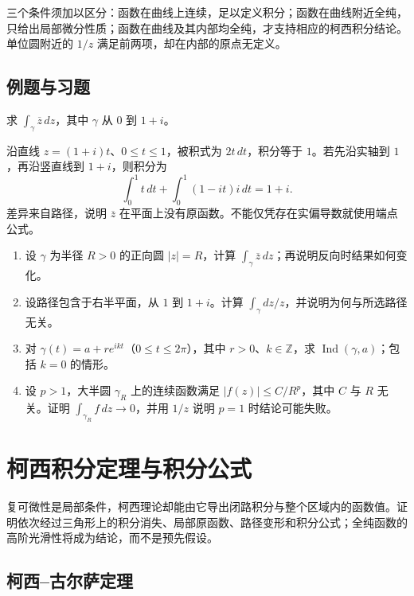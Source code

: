 \documentclass[UTF8,12pt,a4paper,fontset=fandol]{ctexbook}
\begin{document}
三个条件须加以区分：函数在曲线上连续，足以定义积分；函数在曲线附近全纯，只给出局部微分性质；函数在曲线及其内部均全纯，才支持相应的柯西积分结论。单位圆附近的 $1/z$ 满足前两项，却在内部的原点无定义。

\section{例题与习题}

\begin{example}[路径不同导致积分不同]
求 $\int_\gamma\overline z\,dz$，其中 $\gamma$ 从 $0$ 到 $1+i$。
\end{example}
\begin{solve}
沿直线 $z=(1+i)t$、$0\le t\le1$，被积式为 $2t\,dt$，积分等于 $1$。若先沿实轴到 $1$，再沿竖直线到 $1+i$，则积分为
\[
 \int_0^1t\,dt+\int_0^1(1-it)i\,dt=1+i.
\]
差异来自路径，说明 $\overline z$ 在平面上没有原函数。不能仅凭存在实偏导数就使用端点公式。
\end{solve}

\begin{enumerate}
  \item\label{ex:ca-circle-conjugate} 设 $\gamma$ 为半径 $R>0$ 的正向圆 $|z|=R$，计算 $\int_\gamma\overline z\,dz$；再说明反向时结果如何变化。
  \item\label{ex:ca-log-integral} 设路径包含于右半平面，从 $1$ 到 $1+i$。计算 $\int_\gamma dz/z$，并说明为何与所选路径无关。
  \item\label{ex:ca-winding-path} 对 $\gamma(t)=a+re^{ikt}$（$0\le t\le2\pi$），其中 $r>0$、$k\in\mathbb{Z}$，求 $\operatorname{Ind}(\gamma,a)$；包括 $k=0$ 的情形。
  \item\label{ex:ca-arc-estimate} 设 $p>1$，大半圆 $\gamma_R$ 上的连续函数满足 $|f(z)|\le C/R^p$，其中 $C$ 与 $R$ 无关。证明 $\int_{\gamma_R}f\,dz\to0$，并用 $1/z$ 说明 $p=1$ 时结论可能失败。
\end{enumerate}

\chapter{柯西积分定理与积分公式}
\label{chap:ca-cauchy}

复可微性是局部条件，柯西理论却能由它导出闭路积分与整个区域内的函数值。证明依次经过三角形上的积分消失、局部原函数、路径变形和积分公式；全纯函数的高阶光滑性将成为结论，而不是预先假设。

\section{柯西--古尔萨定理}
\end{document}
